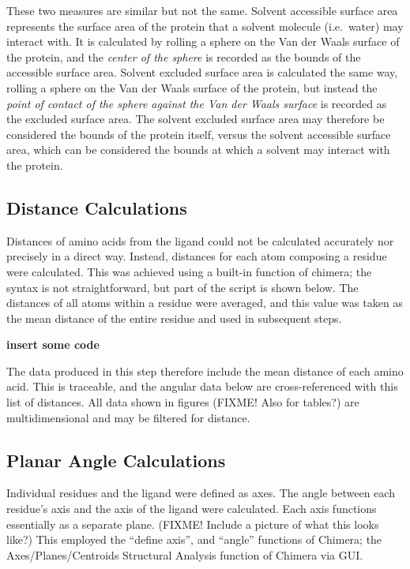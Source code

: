 \documentclass[a4paper, nobind]{templates/ociamthesis}
\begin{document}
These two measures are similar but not the same. Solvent accessible surface area represents the surface area of the protein that a solvent molecule (i.e.~water) may interact with. It is calculated by rolling a sphere on the Van der Waals surface of the protein, and the \emph{center of the sphere} is recorded as the bounds of the accessible surface area. Solvent excluded surface area is calculated the same way, rolling a sphere on the Van der Waals surface of the protein, but instead the \emph{point of contact of the sphere against the Van der Waals surface} is recorded as the excluded surface area. The solvent excluded surface area may therefore be considered the bounds of the protein itself, versus the solvent accessible surface area, which can be considered the bounds at which a solvent may interact with the protein\autocite{Sanner1996}.

\hypertarget{distance-calculations}{%
\subsection{Distance Calculations}\label{distance-calculations}}

Distances of amino acids from the ligand could not be calculated accurately nor precisely in a direct way. Instead, distances for each atom composing a residue were calculated. This was achieved using a built-in function of chimera; the syntax is not straightforward, but part of the script is shown below. The distances of all atoms within a residue were averaged, and this value was taken as the mean distance of the entire residue and used in subsequent steps.

\textbf{insert some code}

The data produced in this step therefore include the mean distance of each amino acid. This is traceable, and the angular data below are cross-referenced with this list of distances. All data shown in figures (FIXME! Also for tables?) are multidimensional and may be filtered for distance.

\hypertarget{planar-angle-calculations}{%
\subsection{Planar Angle Calculations}\label{planar-angle-calculations}}

Individual residues and the ligand were defined as axes. The angle between each residue's axis and the axis of the ligand were calculated. Each axis functions essentially as a separate plane. (FIXME! Include a picture of what this looks like?) This employed the ``define axis'', and ``angle'' functions of Chimera; the Axes/Planes/Centroids Structural Analysis function of Chimera via GUI.
\end{document}
